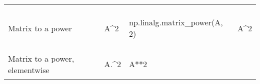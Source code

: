 \documentclass[10pt, landscape]{article}
\newenvironment{Shaded}{}{}
\newcommand{\DecValTok}[1]{\textcolor[rgb]{0.25,0.63,0.44}{{#1}}}
\newcommand{\FloatTok}[1]{\textcolor[rgb]{0.25,0.63,0.44}{{#1}}}
\newcommand{\OperatorTok}[1]{\textcolor[rgb]{0.40,0.40,0.40}{{#1}}}
\newcommand{\NormalTok}[1]{{#1}}
\begin{document}
\begin{multicols*}{2}
\begin{table}[ht]
\begin{tabular}[ ]{@{}llll@{}}
\begin{minipage}[t]{0.20\columnwidth}
\begin{Shaded}
\end{Shaded}
\strut
\end{minipage}\tabularnewline
\begin{minipage}[t]{0.23\columnwidth}\raggedright\strut
Matrix to a power\strut
\end{minipage} & \begin{minipage}[t]{0.22\columnwidth}\raggedright\strut
\begin{Shaded}
\begin{Highlighting}[]
\NormalTok{A^}\FloatTok{2}
\end{Highlighting}
\end{Shaded}
\strut
\end{minipage} & \begin{minipage}[t]{0.23\columnwidth}\raggedright\strut
\begin{Shaded}
\begin{Highlighting}[]
\NormalTok{np.linalg.matrix_power(A, }\DecValTok{2}\NormalTok{)}
\end{Highlighting}
\end{Shaded}
\strut
\end{minipage} & \begin{minipage}[t]{0.20\columnwidth}\raggedright\strut
\begin{Shaded}
\begin{Highlighting}[]
\NormalTok{A^}\FloatTok{2}
\end{Highlighting}
\end{Shaded}
\strut
\end{minipage}\tabularnewline
\begin{minipage}[t]{0.23\columnwidth}\raggedright\strut
Matrix to a power, elementwise\strut
\end{minipage} & \begin{minipage}[t]{0.22\columnwidth}\raggedright\strut
\begin{Shaded}
\begin{Highlighting}[]
\NormalTok{A.^}\FloatTok{2}
\end{Highlighting}
\end{Shaded}
\strut
\end{minipage} & \begin{minipage}[t]{0.23\columnwidth}\raggedright\strut
\begin{Shaded}
\begin{Highlighting}[]
\NormalTok{A}\OperatorTok{**}\DecValTok{2}
\end{Highlighting}
\end{Shaded}
\strut
\end{minipage} & \begin{minipage}[t]{0.20\columnwidth}\raggedright\strut

\end{minipage}
\end{tabular}
\end{table}
\end{multicols*}
\end{document}
